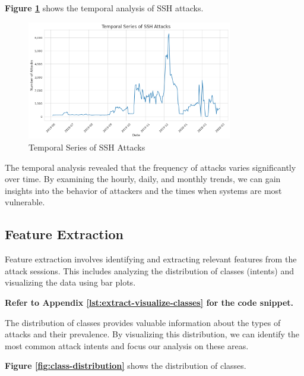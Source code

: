         \textbf{Figure \ref{fig:temporal-analysis}} shows the temporal analysis of SSH attacks.

        \begin{figure}[h]
            \centering
            \includegraphics[width=0.8\textwidth]{../figures/plots/section1/temporal_series_of_ssh_attacks.png}
            \caption{Temporal Series of SSH Attacks}
            \label{fig:temporal-analysis}
        \end{figure}

        The temporal analysis revealed that the frequency of attacks varies significantly over time. By examining the hourly, daily, and monthly trends, we can gain insights into the behavior of attackers and the times when systems are most vulnerable.

    \subsection{Feature Extraction}
    
        Feature extraction involves identifying and extracting relevant features from the attack sessions. This includes analyzing the distribution of classes (intents) and visualizing the data using bar plots.
            
        \textbf{Refer to Appendix \ref{lst:extract-visualize-classes} for the code snippet.}

        The distribution of classes provides valuable information about the types of attacks and their prevalence. By visualizing this distribution, we can identify the most common attack intents and focus our analysis on these areas.

        \textbf{Figure \ref{fig:class-distribution}} shows the distribution of classes.

